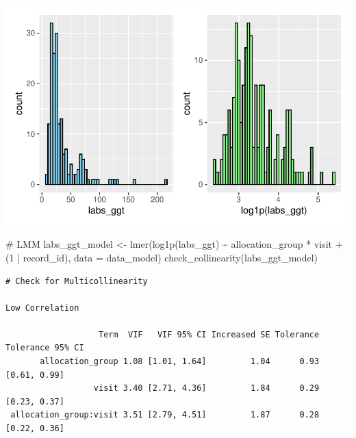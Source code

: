 \documentclass[
  12pt,
]{article}
\newenvironment{Shaded}{\begin{snugshade}}{\end{snugshade}}
\newcommand{\AttributeTok}[1]{\textcolor[rgb]{0.40,0.45,0.13}{#1}}
\newcommand{\CommentTok}[1]{\textcolor[rgb]{0.37,0.37,0.37}{#1}}
\newcommand{\DecValTok}[1]{\textcolor[rgb]{0.68,0.00,0.00}{#1}}
\newcommand{\FunctionTok}[1]{\textcolor[rgb]{0.28,0.35,0.67}{#1}}
\newcommand{\NormalTok}[1]{\textcolor[rgb]{0.00,0.23,0.31}{#1}}
\newcommand{\OtherTok}[1]{\textcolor[rgb]{0.00,0.23,0.31}{#1}}
\newcommand{\SpecialCharTok}[1]{\textcolor[rgb]{0.37,0.37,0.37}{#1}}
\newcommand{\StringTok}[1]{\textcolor[rgb]{0.13,0.47,0.30}{#1}}
\begin{document}
\includegraphics{Outcomes_files/figure-pdf/labs_ggt_1-1.pdf}

\begin{Shaded}
\begin{Highlighting}[]
\CommentTok{\# LMM}
\NormalTok{labs\_ggt\_model }\OtherTok{\textless{}{-}} \FunctionTok{lmer}\NormalTok{(}\FunctionTok{log1p}\NormalTok{(labs\_ggt) }\SpecialCharTok{\textasciitilde{}}\NormalTok{ allocation\_group }\SpecialCharTok{*}\NormalTok{ visit }\SpecialCharTok{+} 
\NormalTok{(}\DecValTok{1} \SpecialCharTok{|}\NormalTok{ record\_id), }\AttributeTok{data =}\NormalTok{ data\_model)}
\FunctionTok{check\_collinearity}\NormalTok{(labs\_ggt\_model)}
\end{Highlighting}
\end{Shaded}

\begin{verbatim}
# Check for Multicollinearity

Low Correlation

                   Term  VIF   VIF 95% CI Increased SE Tolerance Tolerance 95% CI
       allocation_group 1.08 [1.01, 1.64]         1.04      0.93     [0.61, 0.99]
                  visit 3.40 [2.71, 4.36]         1.84      0.29     [0.23, 0.37]
 allocation_group:visit 3.51 [2.79, 4.51]         1.87      0.28     [0.22, 0.36]
\end{verbatim}

\begin{Shaded}
\end{Shaded}
\end{document}
